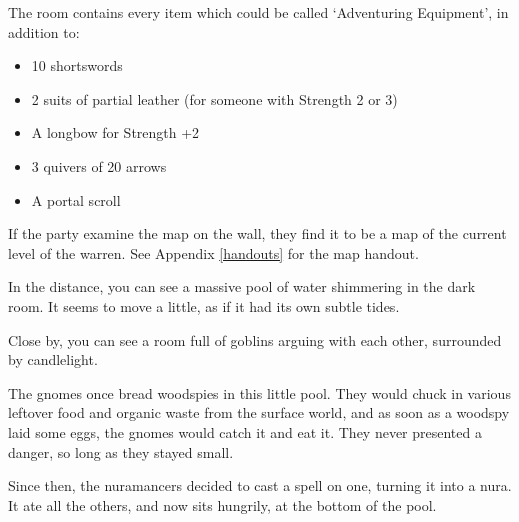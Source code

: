 \begin{multicols}{2}
\begin{boxtext}
\end{boxtext}

The room contains every item which could be called `Adventuring Equipment',
\iftoggle{core}{%
\footnote{See the core book, page \pageref{start_equipment}.}
}{}%
in addition to:

\begin{itemize}

	\item{10 shortswords}
	\item{2 suits of partial leather (for someone with Strength 2 or 3)}
	\iftoggle{hardcore}{%
	\item{1 suit of partial leather (for someone with Strength 1 or 2)}
	}{
	\item{2 suits of partial chain (for someone with Strength 1 or 2)}
	}
	\item{A longbow for Strength +2}
	\item{3 quivers of 20 arrows}
	\item{A portal scroll}

\end{itemize}

If the party examine the map on the wall, they find it to be a map of the current level of the warren.
See Appendix \ref{handouts} for the map handout.


\begin{boxtext}

	In the distance, you can see a massive pool of water shimmering in the dark room.
	It seems to move a little, as if it had its own subtle tides.

	Close by, you can see a room full of goblins arguing with each other, surrounded by candlelight.

\end{boxtext}

\begin{exampletext}

	The gnomes once bread woodspies in this little pool.
	They would chuck in various leftover food and organic waste from the surface world, and as soon as a woodspy laid some eggs, the gnomes would catch it and eat it.
	They never presented a danger, so long as they stayed small.

	Since then, the nuramancers decided to cast a spell on one, turning it into a nura.
	It ate all the others, and now sits hungrily, at the bottom of the pool.

\end{exampletext}


\end{multicols}
